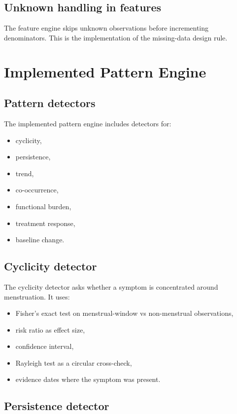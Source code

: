 \documentclass[11pt,a4paper]{article}
\begin{document}
\subsection{Unknown handling in features}

The feature engine skips unknown observations before incrementing denominators. This is the implementation of the missing-data design rule.

\section{Implemented Pattern Engine}

\subsection{Pattern detectors}

The implemented pattern engine includes detectors for:

\begin{itemize}
  \item cyclicity,
  \item persistence,
  \item trend,
  \item co-occurrence,
  \item functional burden,
  \item treatment response,
  \item baseline change.
\end{itemize}

\subsection{Cyclicity detector}

The cyclicity detector asks whether a symptom is concentrated around menstruation. It uses:

\begin{itemize}
  \item Fisher's exact test on menstrual-window vs non-menstrual observations,
  \item risk ratio as effect size,
  \item confidence interval,
  \item Rayleigh test as a circular cross-check,
  \item evidence dates where the symptom was present.
\end{itemize}

\subsection{Persistence detector}
\end{document}
